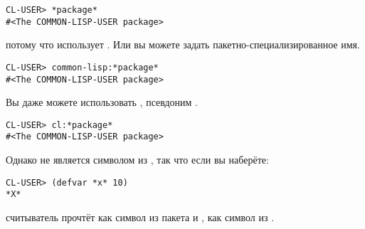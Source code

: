 \begin{lstlisting}
CL-USER> *package*
#<The COMMON-LISP-USER package>
\end{lstlisting}

потому что  использует . Или вы можете задать
пакетно-специализированное имя.

\begin{lstlisting}
CL-USER> common-lisp:*package*
#<The COMMON-LISP-USER package>
\end{lstlisting}

Вы даже можете использовать , псевдоним .

\begin{lstlisting}
CL-USER> cl:*package*
#<The COMMON-LISP-USER package>
\end{lstlisting}

Однако  не является символом из , так что если вы наберёте:

\begin{lstlisting}
CL-USER> (defvar *x* 10)
*X*
\end{lstlisting}

считыватель прочтёт  как символ из пакета  и ,
как символ из .

